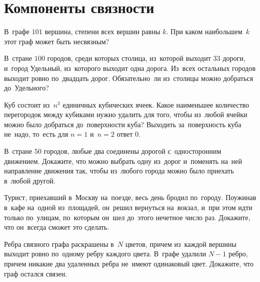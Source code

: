 
\section*{Компоненты связности}


\begin{problems}

\item
В~графе $101$ вершина, степени всех вершин равны $k$.
При каком наибольшем~$k$ этот граф может быть несвязным?

\item
В~стране $100$ городов, среди которых столица, из~которой выходит $33$ дороги,
и~город Удельный, из~которого выходит одна дорога.
Из~всех остальных городов выходит ровно по~двадцать дорог.
Обязательно~ли из~столицы можно добраться до~Удельного?

\item
Куб состоит из~$n^3$ единичных кубических ячеек.
Какое наименьшее количество перегородок между кубиками нужно удалить для того,
чтобы из~любой ячейки можно было добраться до~поверхности куба?
Выходить за~поверхность куба не~надо, то~есть для $n = 1$ и~$n = 2$ ответ $0$.

\item
В~стране $50$ городов, любые два соединены дорогой с~односторонним движением.
Докажите, что можно выбрать одну из~дорог и~поменять на~ней направление
движения так, чтобы из~любого города можно было приехать в~любой другой.

\item
Турист, приехавший в~Москву на~поезде, весь день бродил по~городу.
Поужинав в~кафе на~одной из~площадей, он~решил вернуться на~вокзал, и~при этом
идти только по~улицам, по~которым он~шел до~этого нечетное число раз.
Докажите, что он~всегда сможет это сделать.

\item
Ребра связного графа раскрашены в~$N$ цветов, причем из~каждой вершины выходит
ровно по~одному ребру каждого цвета.
В~графе удалили $N - 1$ ребро, причем никакие два удаленных ребра не~имеют
одинаковый цвет.
Докажите, что граф остался связен.

\end{problems}

